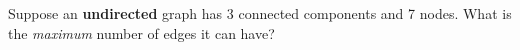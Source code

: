 \begin{prob}
    Suppose an \textbf{undirected} graph has 3 connected components and 7 nodes. What is the \textit{maximum} number of edges it can have? 

\end{prob}